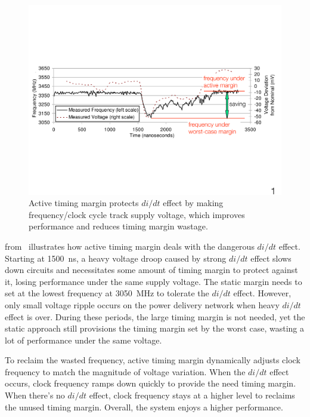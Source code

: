 \begin{figure}[t!]
\centering 
  \includegraphics[trim=0 200 0 200,clip,width=0.95\linewidth]{graphs/background/example.pdf}
  \caption{Active timing margin protects $di/dt$ effect by making frequency/clock cycle track supply voltage, which improves performance and reduces timing margin wastage.}
  \label{fig:didt-example}
\vspace{-0.2in}
\end{figure}

 from~\cite{lefurgy2011active} illustrates how active timing margin deals with the dangerous $di/dt$ effect. Starting at 1500~ns, a heavy voltage droop caused by strong $di/dt$ effect slows down circuits and necessitates some amount of timing margin to protect against it, losing performance under the same supply voltage. The static margin needs to set at the lowest frequency at 3050~MHz to tolerate the $di/dt$ effect. However, only small voltage ripple occurs on the power delivery network when heavy $di/dt$ effect is over. During these periods, the large timing margin is not needed, yet the static approach still provisions the timing margin set by the worst case, wasting a lot of performance under the same voltage. 

To reclaim the wasted frequency, active timing margin dynamically adjusts clock frequency to match the magnitude of voltage variation. When the $di/dt$ effect occurs, clock frequency ramps down quickly to provide the need timing margin. When there's no $di/dt$ effect, clock frequency stays at a higher level to reclaims the unused timing margin. Overall, the system enjoys a higher performance.